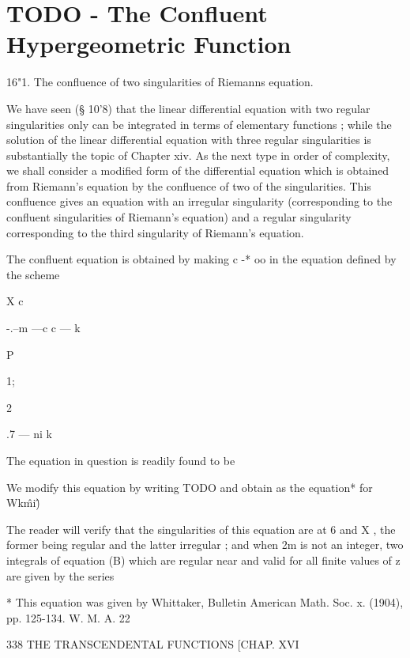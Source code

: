 \chapter{TODO - The Confluent Hypergeometric Function}

16"1. The confluence of two singularities of Riemanns equation. 

We have seen (§ 10'8) that the linear differential equation with two 
regular singularities only can be integrated in terms of elementary functions ; 
while the solution of the linear differential equation with three regular 
singularities is substantially the topic of Chapter xiv. As the next type 
in order of complexity, we shall consider a modified form of the differential 
equation which is obtained from Riemann's equation by the confluence of 
two of the singularities. This confluence gives an equation with an irregular 
singularity (corresponding to the confluent singularities of Riemann's equation) 
and a regular singularity corresponding to the third singularity of Riemann's 
equation. 

The confluent equation is obtained by making c -* oo in the equation 
defined by the scheme 

X c  

-.--m —c c — k 



P 



1; 



2 

.7 — ni k 



The equation in question is readily found to be 

We modify this equation by writing 
TODO
and obtain as the 
equation* for Wk\^mi\^) 



The reader will verify that the singularities of this equation are at 
6 and X , the former being regular and the latter irregular ; and when 2m 
is not an integer, two integrals of equation (B) which are regular near and 
valid for all finite values of z are given by the series 



* This equation was given by Whittaker, Bulletin American Math. Soc. x. (1904), pp. 125-134. 
W. M. A. 22 



338 THE TRANSCENDENTAL FUNCTIONS [CHAP. XVI 




